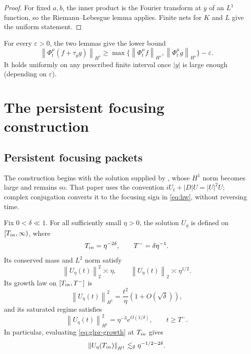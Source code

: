 \documentclass[10pt,a4paper]{amsart}
\numberwithin{equation}{section}
\newcommand{\norm}[1]{\left\lVert #1\right\rVert}
\newcommand{\flow}[1]{\Phi^{#1}}
\newcommand{\trans}[1]{\tau_{#1}}
\begin{document}
\begin{proof}
For fixed $a,b$, the inner product is the Fourier transform at $y$ of
an $L^1$ function, so the Riemann--Lebesgue lemma applies.  Finite nets for
$K$ and $L$ give the uniform statement.
\end{proof}

For every $\varepsilon>0$, the two lemmas give the lower bound
\begin{equation}\label{eq:max-lower}
 \norm{\flow\mu_t(f+\trans yg)}_{H^s}
 \geq\max\{\norm{\flow\mu_tf}_{H^s},
 \norm{\flow\mu_tg}_{H^s}\}-\varepsilon.
\end{equation}
It holds uniformly on any prescribed finite interval once $|y|$ is large
enough (depending on $\varepsilon$).

\section{The persistent focusing construction}
\label{sec:persistent-focusing}

\subsection{Persistent focusing packets}

The construction begins with the solution supplied by
\cite[Theorem~1.2]{GLPR}, whose $H^1$ norm becomes large and remains so.  That
paper uses the convention
$iU_t+|D|U=|U|^2U$; complex conjugation converts it to the focusing sign in
\eqref{eq:hw}, without reversing time.

Fix $0<\delta\ll1$.  For all sufficiently small $\eta>0$, the solution
$U_\eta$ is defined on $[T_{\rm in},\infty)$, where
\begin{equation}\label{eq:times}
 T_{\rm in}=\eta^{-2\delta},
 \qquad T^-=\delta\eta^{-1}.
\end{equation}
Its conserved mass and $L^2$ norm satisfy
\begin{equation}\label{eq:glpr-mass}
 \norm{U_\eta(t)}_2^2\asymp\eta,
 \qquad \norm{U_\eta(t)}_2\asymp\eta^{1/2}.
\end{equation}
Its growth law on
$[T_{\rm in},T^-]$ is
\begin{equation}\label{eq:glpr-growth}
 \norm{U_\eta(t)}_{H^1}^2
 =\frac{t^2}{\eta}(1+O(\sqrt\delta)),
\end{equation}
and its saturated regime satisfies
\begin{equation}\label{eq:glpr-saturation}
 \norm{U_\eta(t)}_{H^1}^2
 =\eta^{-3}e^{O(1/\delta)},
 \qquad t\geq T^-.
\end{equation}
In particular, evaluating \eqref{eq:glpr-growth} at $T_{\rm in}$ gives
\begin{equation}\label{eq:glpr-initial-h1}
 \norm{U_\eta(T_{\rm in})}_{H^1}
 \lesssim_\delta\eta^{-1/2-2\delta}.
\end{equation}
\end{document}
